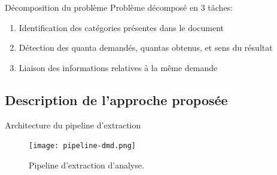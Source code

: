 \documentclass[newPxFont,pagenumber]{beamer}
\begin{document}
\begin{frame}{Décomposition du problème}
Problème décomposé en 3 tâches:
\begin{enumerate}
\item Identification des catégories présentes dans le document
\item Détection des quanta demandés, quantas obtenus, et sens du résultat
\item Liaison des informations relatives à la même demande
\end{enumerate}
\end{frame}

\subsection{Description de l'approche proposée}
\begin{frame}{Architecture du pipeline d'extraction}
\begin{figure}
\texttt{[image: pipeline-dmd.png]}
\caption{Pipeline d'extraction d'analyse.}
\end{figure}
\end{frame}
\end{document}
